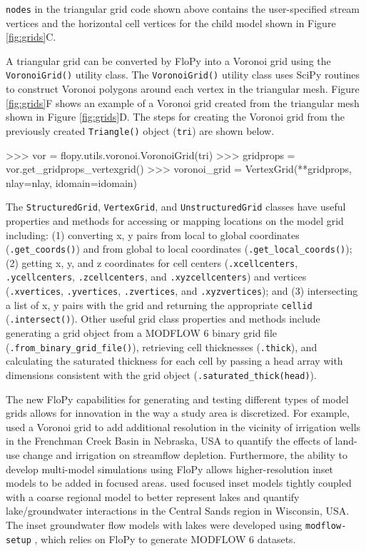 \documentclass[12pt, oneside]{article}  	%
\begin{document}
\noindent \texttt{nodes} in the triangular grid code shown above contains the user-specified stream vertices and the horizontal cell vertices for the child model shown in Figure \ref{fig:grids}C. 

A triangular grid can be converted by FloPy into a Voronoi grid using the \texttt{VoronoiGrid()} utility class. The \texttt{VoronoiGrid()} utility class uses SciPy routines \citep{2020SciPy-NMeth} to construct Voronoi polygons around each vertex in the triangular mesh. Figure \ref{fig:grids}F shows an example of a Voronoi grid created from the triangular mesh shown in Figure \ref{fig:grids}D. The steps for creating the Voronoi grid from the previously created \texttt{Triangle()} object (\texttt{tri}) are shown below.

\begin{python}
>>> vor = flopy.utils.voronoi.VoronoiGrid(tri)
>>> gridprops = vor.get_gridprops_vertexgrid()
>>> voronoi_grid = VertexGrid(**gridprops, nlay=nlay, idomain=idomain)
\end{python}

The \texttt{StructuredGrid}, \texttt{VertexGrid}, and \texttt{UnstructuredGrid} classes have useful properties and methods for accessing or mapping locations on the model grid including: (1) converting x, y pairs from local to global coordinates (\texttt{.get\_coords()}) and from global to local coordinates (\texttt{.get\_local\_coords()}); (2) getting x, y, and z coordinates for cell centers (\texttt{.xcellcenters}, \texttt{.ycellcenters}, \texttt{.zcellcenters}, and \texttt{.xyzcellcenters}) and vertices (\texttt{.xvertices}, \texttt{.yvertices}, \texttt{.zvertices}, and \texttt{.xyzvertices}); and (3) intersecting a list of x, y pairs with the grid and returning the appropriate \texttt{cellid} (\texttt{.intersect()}). Other useful grid class properties and methods include generating a grid object from a MODFLOW 6 binary grid file (\texttt{.from\_binary\_grid\_file()}), retrieving cell thicknesses (\texttt{.thick}), and calculating the saturated thickness for each cell by passing a head array with dimensions consistent with the grid object (\texttt{.saturated\_thick(head)}).

The new FloPy capabilities for generating and testing different types of model grids allows for innovation in the way a study area is discretized. For example, \cite{Moussa2018} used a Voronoi grid to add additional resolution in the vicinity of irrigation wells in the Frenchman Creek Basin in Nebraska, USA to quantify the effects of land-use change and irrigation on streamflow depletion. Furthermore, the ability to develop multi-model simulations using FloPy allows higher-resolution inset models to be added in focused areas. \cite{fienen2022simulation} used focused inset models tightly coupled with a coarse regional model to better represent lakes and quantify lake/groundwater interactions in the Central Sands region in Wisconsin, USA. The inset groundwater flow models with lakes \citep{fienen2022simulation} were developed using \texttt{modflow-setup} \citep{leaf2022modflow}, which relies on FloPy to generate MODFLOW 6 datasets.
\end{document}
